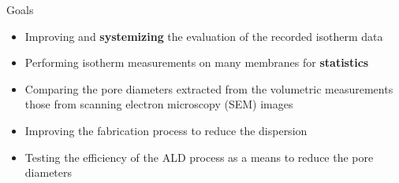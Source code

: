 \documentclass{beamer}
\begin{document}
  \begin{frame}{Goals}
    \begin{itemize}
      \pause
      \item Improving and \textbf{systemizing} the evaluation of the recorded isotherm data

      \item Performing isotherm measurements on many membranes for \textbf{statistics}
      \pause

      \item Comparing the pore diameters extracted from the volumetric measurements those from scanning electron microscopy (SEM) images
      \pause

      \item Improving the fabrication process to reduce the dispersion
      \pause

      \item Testing the efficiency of the ALD process as a means to reduce the pore diameters
    \end{itemize}
  \end{frame}
\end{document}
